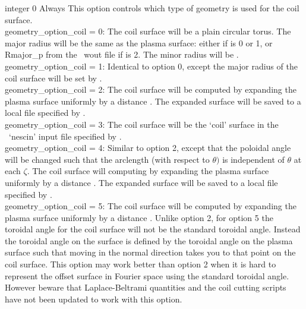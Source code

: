 {integer}
{0}
{Always}
{This option controls which type of geometry is used for the coil surface.\\

{\ttfamily geometry\_option\_coil} = 0: The coil surface will be a plain circular torus. The major radius will be the 
same as the plasma surface: either  if  is 0 or 1, or {\ttfamily Rmajor\_p} from the \vmec~{\ttfamily wout} file
if   is 2.
     The minor radius will be .\\

{\ttfamily geometry\_option\_coil} = 1: Identical to option 0, except the major radius of the coil surface will be set by .\\

{\ttfamily geometry\_option\_coil} = 2: The coil surface will be computed by expanding the plasma surface uniformly by a distance . The expanded surface will be saved to a local file specified by . \\

{\ttfamily geometry\_option\_coil} = 3: The coil surface will be the `coil' surface in the \nescoil~`nescin' input file specified by . \\

{\ttfamily geometry\_option\_coil} = 4: Similar to option 2, except that the poloidal angle will be changed such that the arclength (with respect to $\theta)$ is independent of $\theta$ at each $\zeta$. The coil surface will computing by expanding the plasma surface uniformly by a distance . The expanded surface will be saved to a local file specified by . \\

{\ttfamily geometry\_option\_coil} = 5: The coil surface will be computed by expanding the plasma surface uniformly by a distance . Unlike option 2, for option 5 the toroidal angle for the coil surface will not be the standard toroidal angle. Instead the toroidal angle on the surface is defined by the toroidal angle on the plasma surface such that moving in the normal direction takes you to that point on the coil surface. This option may work better than option 2 when it is hard to represent the offset surface in Fourier space using the standard toroidal angle. However beware that Laplace-Beltrami quantities and the coil cutting scripts have not been updated to work with this option. \\
}

